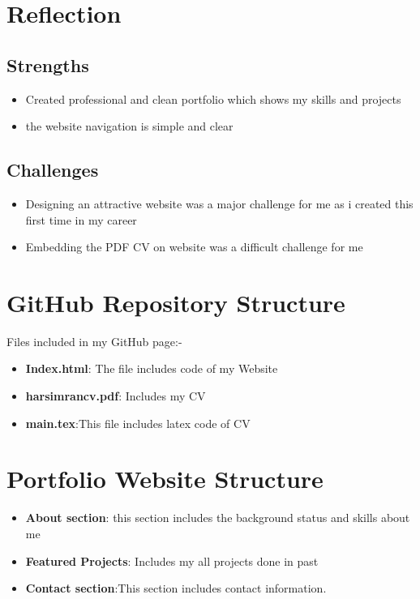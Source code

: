 \documentclass{article}
\begin{document}
\section{Reflection}

\subsection{Strengths}
\begin{itemize}
    \item Created professional and clean portfolio which shows my skills and projects  
    \item the website navigation is simple and clear 
\end{itemize}

\subsection{Challenges} 
\begin{itemize}
    \item Designing an attractive website was a major challenge for me as i created this first time in my career
    \item Embedding the PDF CV on website was a difficult challenge for  me
\end{itemize}

\section{GitHub Repository Structure}
 Files included in my GitHub page:-

\begin{itemize}
    \item \textbf{Index.html}: The file includes code of my Website
    \item \textbf{harsimrancv.pdf}: Includes my CV 
    \item \textbf{main.tex}:This file includes latex code of CV
\end{itemize}
    
\section{Portfolio Website Structure}
\begin{itemize}
    \item \textbf{About section}: this section includes the background status and skills about me 
    \item \textbf{Featured Projects}: Includes my all projects done in past 
    \item \textbf{Contact section}:This section includes contact information.
\end{itemize}
    
\end{document}
